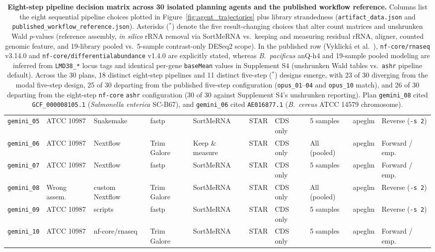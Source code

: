 \documentclass[11pt,letterpaper]{article}
\newcommand{\tool}[1]{\textsf{#1}}
\begin{document}
\begin{table}[!htbp]
{\begin{tabular}{@{}llllllllll@{}}
\texttt{gemini\_05} & ATCC 10987 & \tool{Snakemake} & \tool{fastp} & \tool{SortMeRNA} & \tool{STAR} & CDS only & 5 samples & apeglm & Reverse (\texttt{-s 2}) \\
\texttt{gemini\_06} & ATCC 10987 & \tool{Nextflow} & \tool{Trim Galore} & Keep \& measure & \tool{STAR} & CDS only & All (pooled) & apeglm & Forward / emp. \\
\texttt{gemini\_07} & ATCC 10987 & \tool{Nextflow} & \tool{fastp} & \tool{SortMeRNA} & \tool{STAR} & CDS only & 5 samples & apeglm & Forward / emp. \\
\texttt{gemini\_08} & Wrong assem. & custom \tool{Nextflow} & \tool{Trim Galore} & \tool{SortMeRNA} & \tool{STAR} & CDS only & All (pooled) & apeglm & Reverse (\texttt{-s 2}) \\
\texttt{gemini\_09} & ATCC 10987 & scripts & \tool{fastp} & \tool{SortMeRNA} & \tool{STAR} & CDS only & 5 samples & apeglm & Reverse (\texttt{-s 2}) \\
\texttt{gemini\_10} & ATCC 10987 & \tool{nf-core/rnaseq} & \tool{Trim Galore} & \tool{SortMeRNA} & \tool{STAR} & CDS only & 5 samples & apeglm & Forward / emp. \\
\bottomrule
\end{tabular}%
}
\caption{\textbf{Eight-step pipeline decision matrix across 30 isolated planning agents and the published workflow reference.} Columns list the eight sequential pipeline choices plotted in Figure~\ref{fig:agent_trajectories} plus library strandedness (\nolinkurl{artifact_data.json} and \nolinkurl{published_workflow_reference.json}). Asterisks ($^*$) denote the five result-changing choices that alter count matrices and unshrunken Wald $p$-values (reference assembly, \textit{in silico} rRNA removal via \tool{SortMeRNA} vs.\ keeping and measuring residual rRNA, aligner, counted genomic feature, and 19-library pooled vs.\ 5-sample contrast-only \tool{DESeq2} scope). In the published row (Vyklick{\'a} et al.\ \cite{vyklicka2026}), \texttt{nf-core/rnaseq} v3.14.0 and \texttt{nf-core/differentialabundance} v1.4.0 are explicitly stated, whereas \textit{B.\ pacificus} anQ-h4 and 19-sample pooled modeling are inferred from \texttt{LMD38\_*} locus tags and identical per-gene \texttt{baseMean} values in Supplement S4 (unshrunken Wald tables vs.\ \texttt{ashr} pipeline default). Across the 30 plans, 18 distinct eight-step pipelines and 11 distinct five-step ($^*$) designs emerge, with 23 of 30 diverging from the modal five-step design, 25 of 30 departing from the published five-step configuration (\texttt{opus\_01}--\texttt{04} and \texttt{opus\_10} match), and 26 of 30 departing from the eight-step \texttt{nf-core} \texttt{ashr} configuration (30 of 30 against Supplement S4's unshrunken reporting). Plan \texttt{gemini\_08} cited \texttt{GCF\_000008105.1} (\textit{Salmonella enterica} SC-B67), and \texttt{gemini\_06} cited \texttt{AE016877.1} (\textit{B.\ cereus} ATCC 14579 chromosome).}
\label{tab:planning_matrix}
\end{table}
\end{document}
